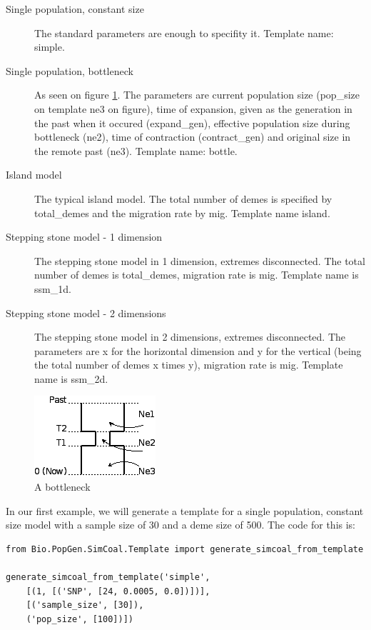\documentclass{report}
\begin{document}
\begin{description}
\item[Single population, constant size] The standard parameters are enough to specifity
it. Template name: simple.
\item[Single population, bottleneck] As seen on figure \ref{fig:bottle}. The parameters
are current population size (pop\_size on template ne3 on figure), time of expansion,
given as the generation in the past when it occured (expand\_gen), 
effective population size during bottleneck (ne2), time of contraction
(contract\_gen) and original size in the remote past (ne3). Template name: bottle.
\item[Island model] The typical island model. The total number of demes is specified
by total\_demes and the migration rate by mig. Template name island.
\item[Stepping stone model - 1 dimension] The stepping stone model in 1 dimension,
extremes disconnected. The total number of demes is total\_demes, migration rate
is mig. Template name is ssm\_1d.
\item[Stepping stone model - 2 dimensions] The stepping stone model in 2 dimensions,
extremes disconnected. The parameters are x for the horizontal dimension and y
for the vertical (being the total number of demes x times y), migration rate is mig.
Template name is ssm\_2d.
\end{description}

\begin{htmlonly}
\label{fig:bottle}
\end{htmlonly}

\begin{latexonly}
\begin{figure}[htbp]
\centering
\includegraphics{images/bottle.png}
\caption{A bottleneck}
\label{fig:bottle}
\end{figure}
\end{latexonly}

In our first example, we will generate a template for a single population, constant size
model with a sample size of 30 and a deme size of 500. The code for this is:

\begin{verbatim}
from Bio.PopGen.SimCoal.Template import generate_simcoal_from_template

generate_simcoal_from_template('simple',
    [(1, [('SNP', [24, 0.0005, 0.0])])],
    [('sample_size', [30]),
    ('pop_size', [100])])
\end{verbatim}
\end{document}
